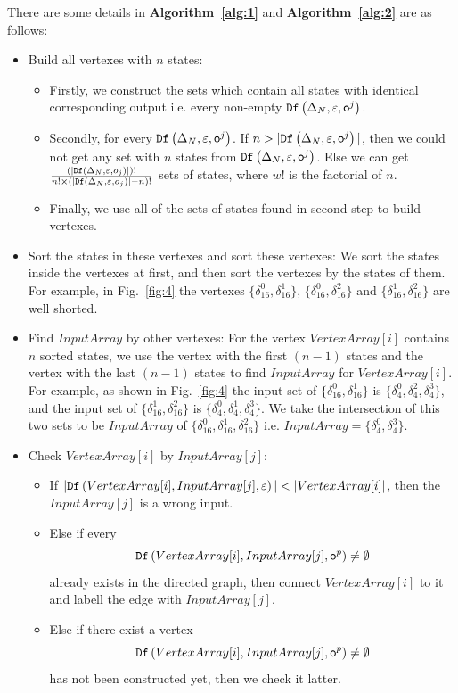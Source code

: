 There are some details in {\bf Algorithm~\ref{alg:1}} and {\bf Algorithm~\ref{alg:2}} are as follows:
\begin{itemize}
\item Build all vertexes with $n$ states:
\begin{itemize}
\item Firstly, we construct the sets which contain all states with identical corresponding output i.e. every non-empty ${\tt Df}\left(\Delta_N,\varepsilon,\mathsf{o}^{j}\right)$.
\item Secondly, for every ${\tt Df}\left(\Delta_N,\varepsilon,\mathsf{o}^{j}\right)$. If $n>|{\tt Df}\left(\Delta_N,\varepsilon,\mathsf{o}^{j}\right)|$, then we could not get any set with $n$ states from ${\tt Df}\left(\Delta_N,\varepsilon,\mathsf{o}^{j}\right)$. Else we can get $\frac{(|{\tt Df}\left(\Delta_N,\varepsilon,o_j\right)|)!}{n!\times (|{\tt Df}\left(\Delta_N,\varepsilon,o_j\right)|-n)!}$ sets of states, where $w!$ is the factorial of $n$.
\item Finally, we use all of the sets of states found in second step to build vertexes. 
\end{itemize} 
 \item Sort the states in these vertexes and sort these vertexes: We sort the states inside the vertexes at first, and then sort the vertexes by the states of them. For example, in Fig.~\ref{fig:4} the vertexes $\{\delta_{16}^0,\delta_{16}^1\}$, $\{\delta_{16}^0,\delta_{16}^2\}$ and $\{\delta_{16}^1,\delta_{16}^2\}$ are well shorted. 
  \item Find $InputArray$ by other vertexes:
   For the vertex $VertexArray[i]$ contains $n$ sorted states, we use the vertex with the first $(n-1)$ states and the vertex with the last $(n-1)$ states to find $InputArray$ for $VertexArray[i]$. For example, as shown in Fig.~\ref{fig:4} the input set of $\{\delta_{16}^0,\delta_{16}^1\}$ is $\{\delta_{4}^0,\delta_{4}^2,\delta_{4}^3\}$, and the input set of $\{\delta_{16}^1,\delta_{16}^2\}$ is $\{\delta_{4}^0,\delta_{4}^1,\delta_{4}^3\}$. We take the intersection of this two sets to be $InputArray$ of $\{\delta_{16}^0,\delta_{16}^1,\delta_{16}^2\}$ i.e. $InputArray=\{\delta_{4}^0,\delta_{4}^3\}$. 
  \item Check $VertexArray[i]$ by $InputArray[j]$:
     
\begin{itemize}
\item If $|\Ded\left(VertexArray[i],InputArray[j],\varepsilon\right)|<|VertexArray[i]|$, then the $InputArray[j]$ is a wrong input.
\item Else if every \[{\tt Df}\left(VertexArray[i],InputArray[j],\mathsf{o}^{p}\right)\ne\emptyset\] already exists in the directed graph, then connect $VertexArray[i]$ to it and labell the edge with $InputArray[j]$.
\item Else if there exist a vertex \[{\tt Df}\left(VertexArray[i],InputArray[j],\mathsf{o}^{p}\right)\ne\emptyset\] has not been constructed yet, then we check it latter. 
\end{itemize} 
\end{itemize} 


